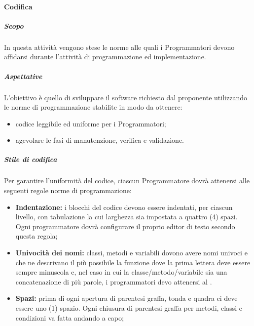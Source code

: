 			\paragraph{Codifica}
				\subparagraph{Scopo}	
					In questa attività vengono stese le norme alle quali i Programmatori devono affidarsi durante l’attività di  programmazione ed implementazione.
				\subparagraph{Aspettative}
					 L’obiettivo è quello di sviluppare il software richiesto dal proponente utilizzando le norme di programmazione stabilite in modo da ottenere:
					 	\begin{itemize}
					 	\item codice leggibile ed uniforme per i Programmatori;
					 	\item agevolare le fasi di manutenzione, verifica e validazione.
					 \end{itemize} 
				 \subparagraph{Stile di codifica}
				 	Per garantire l'uniformità del codice, ciascun Programmatore dovrà attenersi alle seguenti regole norme di programmazione: 
					\begin{itemize}
						\item \textbf{Indentazione:} i blocchi del codice devono essere indentati, per ciascun livello, con tabulazione la cui larghezza sia impostata a quattro (4) spazi. Ogni programmatore dovrà configurare il proprio editor di testo secondo questa regola;
						\item \textbf{Univocità dei nomi:} classi, metodi e variabili dovono avere nomi univoci e che ne descrivano il più possibile la funzione dove la prima lettera deve essere sempre minuscola e, nel caso in cui la classe/metodo/variabile sia una concatenazione di più parole, i programmatori devo attenersi al .
						\item \textbf{Spazi:} prima di ogni apertura di parentesi graffa, tonda e quadra ci deve essere uno (1) spazio. Ogni chiusura di parentesi graffa per metodi, classi e condizioni va fatta andando a capo;
					\end{itemize}
					
				 
